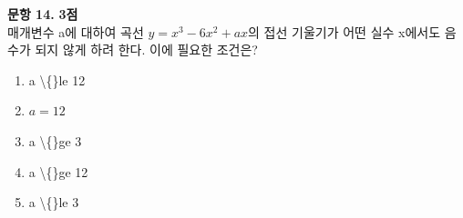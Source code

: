 \documentclass[11pt]{article}
\begin{document}
\textbf{문항 14.} \hfill \textbf{3점}\\
매개변수 a에 대하여 곡선 \(y=x^3-6x^2+ax\)의 접선 기울기가 어떤 실수 x에서도 음수가 되지 않게 하려 한다. 이에 필요한 조건은?\\
\begin{enumerate}[label=\arabic*), leftmargin=2.4em]
\item a \textbackslash\{\}le 12
\item \(a=12\)
\item a \textbackslash\{\}ge 3
\item a \textbackslash\{\}ge 12
\item a \textbackslash\{\}le 3
\end{enumerate}
\end{document}
